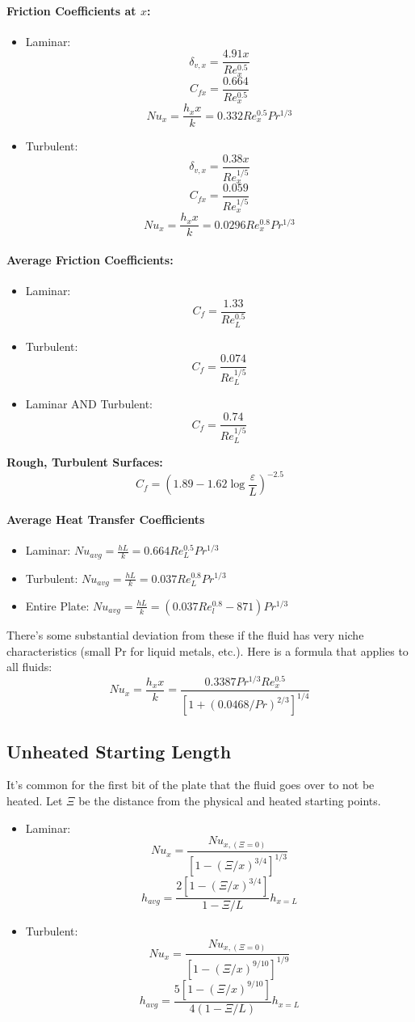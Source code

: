 \documentclass[a4paper,12pt]{report}
\begin{document}
\paragraph{Friction Coefficients at $x$:}
\begin{itemize}
\item Laminar: $$\delta_{v, x} = \frac{4.91 x}{Re_x^0.5}$$
$$C_{fx} = \frac{0.664}{Re_{x}^0.5}$$
$$Nu_x = \frac{h_xx}{k} = 0.332 Re_x^{0.5}Pr^{1/3}$$
\item Turbulent: $$\delta_{v, x} = \frac{0.38 x}{Re_x^{1/5}}$$
$$C_{fx} = \frac{0.059}{Re_x^{1/5}}$$
$$Nu_x = \frac{h_xx}{k} = 0.0296Re_x^{0.8}Pr^{1/3}$$
\end{itemize}

\paragraph{Average Friction Coefficients: }
\begin{itemize}
\item Laminar: $$C_f = \frac{1.33}{Re_L^{0.5}}$$
\item Turbulent: $$C_f = \frac{0.074}{Re_L^{1/5}}$$
\item Laminar AND Turbulent: $$C_f = \frac{0.74}{Re_L^{1/5}}$$
\end{itemize}

\textbf{Rough, Turbulent Surfaces: } $$C_f = (1.89 - 1.62 \log \frac{\varepsilon}{L})^{-2.5}$$

\paragraph{Average Heat Transfer Coefficients}
\begin{itemize}
\item Laminar: $Nu_{avg} = \frac{hL}{k} = 0.664 Re_L^0.5 Pr^{1/3}$
\item Turbulent: $Nu_{avg} = \frac{hL}{k} = 0.037 Re_L^{0.8}Pr^{1/3}$
\item Entire Plate: $Nu_{avg} = \frac{hL}{k} = (0.037 Re_l^{0.8} - 871)Pr^{1/3}$
\end{itemize}
There's some substantial deviation from these if the fluid has very niche characteristics (small Pr for liquid metals, etc.). Here is a 
formula that applies to all fluids: $$Nu_x = \frac{h_xx}{k} = \frac{0.3387 Pr^{1/3} Re_x^{0.5}}{[1+(0.0468/Pr)^{2/3}]^{1/4}}$$

\subsection{Unheated Starting Length}
It's common for the first bit of the plate that the fluid goes over to not be heated. Let $\Xi$ be the distance from the physical and heated starting points.
\begin{itemize}
\item Laminar: $$Nu_x = \frac{Nu_{x, (\Xi = 0)}}{[1-(\Xi/x)^{3/4}]^{1/3}}$$
$$h_{avg} = \frac{2[1-(\Xi/x)^{3/4}]}{1-\Xi/L} h_{x=L}$$

\item Turbulent: $$Nu_x = \frac{Nu_{x, (\Xi = 0)}}{[1-(\Xi/x)^{9/10}]^{1/9}}$$
$$h_{avg} = \frac{5[1-(\Xi/x)^{9/10}]}{4(1-\Xi/L)}h_{x=L}$$
\end{itemize}
\end{document}
